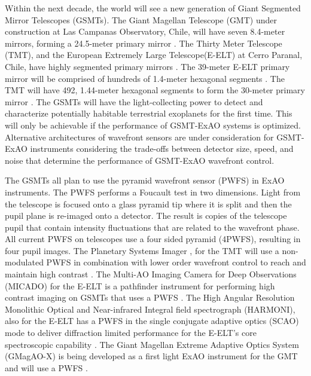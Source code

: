 Within the next decade, the world will see a new generation of Giant Segmented Mirror Telescopes (GSMTs). The Giant Magellan Telescope (GMT) under construction at Las Campanas Observatory, Chile, will have seven 8.4-meter mirrors, forming a 24.5-meter primary mirror \citep{fanson2020overview}. The Thirty Meter Telescope (TMT), and the European Extremely Large Telescope(E-ELT) at Cerro Paranal, Chile, have highly segmented primary mirrors \citep{chisholm2020thirty}. The 39-meter E-ELT primary mirror will be comprised of hundreds of 1.4-meter hexagonal segments \citep{ramsay2020eso}. The TMT will have 492, 1.44-meter hexagonal segments to form the 30-meter primary mirror \citep{sanders2013thirty}. The GSMTs will have the light-collecting power to detect and characterize potentially habitable terrestrial exoplanets for the first time. This will only be achievable if the performance of GSMT-ExAO systems is optimized. Alternative architectures of wavefront sensors are under consideration for GSMT-ExAO instruments considering the trade-offs between detector size, speed, and noise that determine the performance of GSMT-ExAO wavefront control. 

 The GSMTs all plan to use the pyramid wavefront sensor (PWFS) in ExAO instruments. The PWFS performs a Foucault test in two dimensions. Light from the telescope is focused onto a glass pyramid tip where it is split and then the pupil plane is re-imaged onto a detector. The result is copies of the telescope pupil that contain intensity fluctuations that are related to the wavefront phase. All current PWFS on telescopes use a four sided pyramid (4PWFS), resulting in four pupil images. The Planetary Systems Imager \citep{fitzgerald2019planetary}, for the TMT will use a non-modulated PWFS in combination with lower order wavefront control to reach and maintain high contrast \citep{guyon2018wavefront}. The Multi-AO Imaging Camera for Deep Observations (MICADO) for the E-ELT is a pathfinder instrument for performing high contrast imaging on GSMTs that uses a PWFS \citep{davies2018micado}. The High Angular Resolution Monolithic Optical and Near-infrared Integral field spectrograph (HARMONI), also for the E-ELT has a PWFS in the single conjugate adaptive optics (SCAO) mode to deliver diffraction limited performance for the E-ELT's core spectroscopic capability \citep{neichel2016adaptive}. The Giant Magellan Extreme Adaptive Optics System (GMagAO-X) is being developed as a first light ExAO instrument for the GMT and will use a PWFS \citep{males2019gmagao}.

